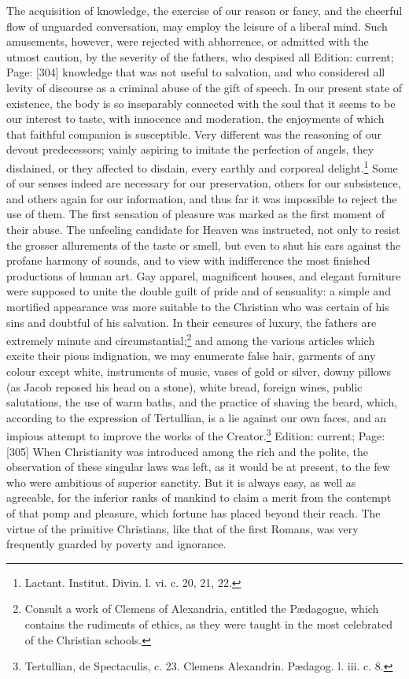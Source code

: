 The acquisition of knowledge, the exercise of our reason or fancy, and the cheerful flow of unguarded conversation, may employ the leisure of a liberal mind. Such amusements, however, were rejected with abhorrence, or admitted with the utmost caution, by the severity of the fathers, who despised all Edition: current; Page: [304] knowledge that was not useful to salvation, and who considered all levity of discourse as a criminal abuse of the gift of speech. In our present state of existence, the body is so inseparably connected with the soul that it seems to be our interest to taste, with innocence and moderation, the enjoyments of which that faithful companion is susceptible. Very different was the reasoning of our devout predecessors; vainly aspiring to imitate the perfection of angels, they disdained, or they affected to disdain, every earthly and corporeal delight.\footnote{Lactant. Institut. Divin. l. vi. c. 20, 21, 22.} Some of our senses indeed are necessary for our preservation, others for our subsistence, and others again for our information, and thus far it was impossible to reject the use of them. The first sensation of pleasure was marked as the first moment of their abuse. The unfeeling candidate for Heaven was instructed, not only to resist the grosser allurements of the taste or smell, but even to shut his ears against the profane harmony of sounds, and to view with indifference the most finished productions of human art. Gay apparel, magnificent houses, and elegant furniture were supposed to unite the double guilt of pride and of sensuality: a simple and mortified appearance was more suitable to the Christian who was certain of his sins and doubtful of his salvation. In their censures of luxury, the fathers are extremely minute and circumstantial;\footnote{Consult a work of Clemens of Alexandria, entitled the Pædagogue, which contains the rudiments of ethics, as they were taught in the most celebrated of the Christian schools.} and among the various articles which excite their pious indignation, we may enumerate false hair, garments of any colour except white, instruments of music, vases of gold or silver, downy pillows (as Jacob reposed his head on a stone), white bread, foreign wines, public salutations, the use of warm baths, and the practice of shaving the beard, which, according to the expression of Tertullian, is a lie against our own faces, and an impious attempt to improve the works of the Creator.\footnote{Tertullian, de Spectaculis, c. 23. Clemens Alexandrin. Pædagog. l. iii. c. 8.} Edition: current; Page: [305] When Christianity was introduced among the rich and the polite, the observation of these singular laws was left, as it would be at present, to the few who were ambitious of superior sanctity. But it is always easy, as well as agreeable, for the inferior ranks of mankind to claim a merit from the contempt of that pomp and pleasure, which fortune has placed beyond their reach. The virtue of the primitive Christians, like that of the first Romans, was very frequently guarded by poverty and ignorance.

